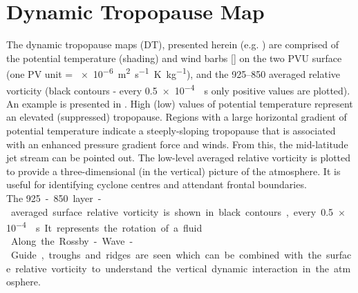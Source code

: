 \section{Dynamic Tropopause Map}
\label{sec:DT}
The dynamic tropopause maps (DT), presented herein (e.g. ) are comprised of the potential temperature (shading) and wind barbs [\SI{}{\mPs}] on the two PVU surface (one PV unit = \SI{e-6}{\metre\squared\per\s\kelvin\per\kg}), and the \num{925}--\SI{850}{\hPa} averaged relative vorticity (black contours - every \SI{.5e-4}{\per\second} only positive values are plotted).  An example is presented in .
High (low) values of potential temperature represent an elevated (suppressed) tropopause. Regions with a large horizontal gradient of potential temperature indicate a steeply-sloping tropopause that is associated with an enhanced pressure gradient force and winds. From this, the mid-latitude jet stream can be pointed out. The low-level averaged relative vorticity is plotted to provide a three-dimensional (in the vertical) picture of the atmosphere. It is useful for identifying cyclone centres and attendant frontal boundaries.
\\
The  \SI{925}-\SI{850}{\hPa} layer-averaged surface relative vorticity is shown in black contours, every \SI{.5e-4}{\per\second}. It represents the rotation of a fluid.
\\
Along the Rossby-Wave-Guide, troughs and ridges are seen which can be combined with the surface relative vorticity to understand the vertical dynamic interaction in the atmosphere. 
